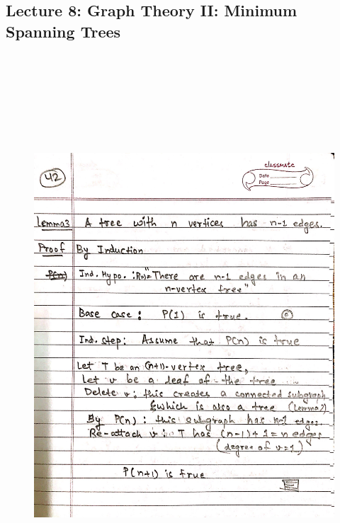 \newpage
{\color{black} \subsection*{Lecture 8: Graph Theory II: Minimum Spanning Trees}}
\begin{figure}[H]
    \centering
    \includegraphics[width=16cm, height=21cm]{"./MIT-6.042J/MIT-6042J-042"}
\end{figure}

